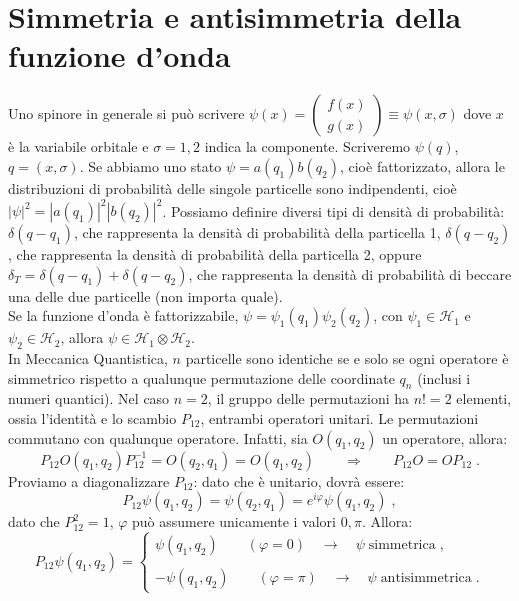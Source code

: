 \documentclass[12pt,a4paper]{report}
\theoremstyle{definition}
\newcommand{\ham}{\mathcal{H}}
\numberwithin{equation}{section}
\begin{document}
\section{Simmetria e antisimmetria della funzione d'onda}
Uno spinore in generale si può scrivere $\psi(x)=\left(\begin{matrix}
f(x) \\
g(x)
\end{matrix}\right)\equiv \psi(x,\sigma)$ dove $x$ è la variabile orbitale e $\sigma=1,2$ indica la componente. Scriveremo $\psi(q)$, $q=(x,\sigma)$. Se abbiamo uno stato $\psi=a(q_1)b(q_2)$, cioè fattorizzato, allora le distribuzioni di probabilità delle singole particelle sono indipendenti, cioè $|\psi|^2=|a(q_1)|^2|b(q_2)|^2$. Possiamo definire diversi tipi di densità di probabilità: $\delta(q-q_1)$, che rappresenta la densità di probabilità della particella 1, $\delta(q-q_2)$, che rappresenta la densità di probabilità della particella 2, oppure $\delta_T=\delta(q-q_1)+\delta(q-q_2)$, che rappresenta la densità di probabilità di beccare una delle due particelle (non importa quale). \\
Se la funzione d'onda è fattorizzabile, $\psi=\psi_1(q_1)\psi_2(q_2)$, con $\psi_1\in\ham_1$ e $\psi_2\in\ham_2$, allora $\psi\in \ham_1\otimes\ham_2$. \\
In Meccanica Quantistica, $n$ particelle sono identiche se e solo se ogni operatore è simmetrico rispetto a qualunque permutazione delle coordinate $q_n$ (inclusi i numeri quantici). Nel caso $n=2$, il gruppo delle permutazioni ha $n!=2$ elementi, ossia l'identità e lo scambio $P_{12}$, entrambi operatori unitari. Le permutazioni commutano con qualunque operatore. Infatti, sia $O(q_1,q_2)$ un operatore, allora:
\begin{equation}
P_{12}O(q_1,q_2)P_{12}^{-1}=O(q_2,q_1)=O(q_1,q_2)\qquad \Longrightarrow \qquad P_{12}O=OP_{12}\;.
\end{equation}
Proviamo a diagonalizzare $P_{12}$: dato che è unitario, dovrà essere:
\begin{equation}
P_{12}\psi(q_1,q_2)=\psi(q_2,q_1)=e^{i\varphi}\psi(q_1,q_2)\;,
\end{equation}
dato che $P_{12}^2=1$, $\varphi$ può assumere unicamente i valori $0,\pi$. Allora:
\begin{equation}
P_{12}\psi(q_1,q_2)=\begin{cases}
\psi(q_1,q_2)\qquad (\varphi=0)\quad\longrightarrow\quad\psi\;\mbox{simmetrica}\;, \\
\\
-\psi(q_1,q_2)\qquad (\varphi=\pi)\quad\longrightarrow\quad\psi\;\mbox{antisimmetrica}\;.
\end{cases}
\end{equation}
\end{document}
